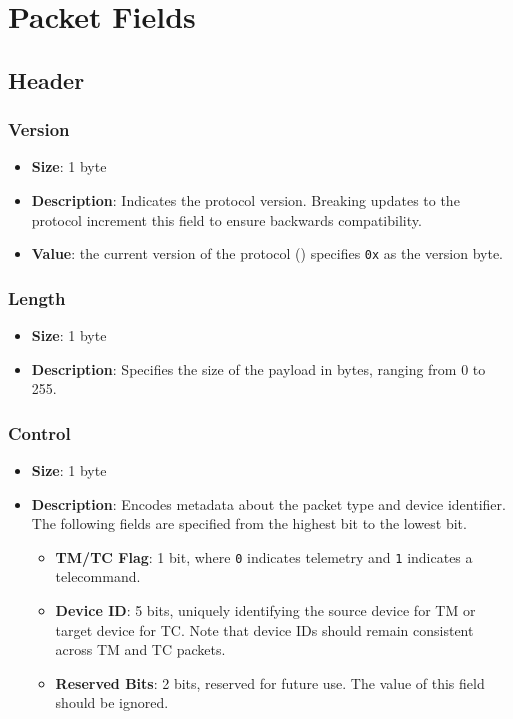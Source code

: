 \documentclass[a4paper,11pt,english]{article}
\begin{document}
\section{Packet Fields}

\subsection{Header}

\subsubsection{Version}
\begin{itemize}
  \item \textbf{Size}: 1 byte
  \item \textbf{Description}: Indicates the protocol version. Breaking updates to the protocol increment this field to ensure backwards compatibility.
  \item \textbf{Value}: the current version of the protocol (\version) specifies \texttt{0x\versionbyte} as the version byte.
\end{itemize}

\subsubsection{Length}
\begin{itemize}
  \item \textbf{Size}: 1 byte
  \item \textbf{Description}: Specifies the size of the payload in bytes, ranging from 0 to 255.
\end{itemize}

\subsubsection{Control}
\begin{itemize}
  \item \textbf{Size}: 1 byte
  \item \textbf{Description}: Encodes metadata about the packet type and device identifier. The following fields are specified from the highest bit to the lowest bit.
        \begin{itemize}
          \item \textbf{TM/TC Flag}: 1 bit, where \texttt{0} indicates telemetry and \texttt{1} indicates a telecommand.
          \item \textbf{Device ID}: 5 bits, uniquely identifying the source device for TM or target device for TC. Note that device IDs should remain consistent across TM and TC packets.
          \item \textbf{Reserved Bits}: 2 bits, reserved for future use. The value of this field should be ignored.
        \end{itemize}
\end{itemize}
\end{document}
